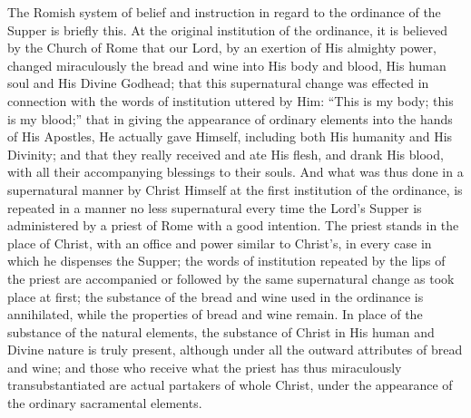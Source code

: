 \documentclass[]{book}
\begin{document}
The Romish system of belief and instruction in regard to the ordinance of the Supper is briefly this. At the original institution of the ordinance, it is believed by the Church of Rome that our Lord, by an exertion of His almighty power, changed miraculously the bread and wine into His body and blood, His human soul and His Divine Godhead; that this supernatural change was effected in connection with the words of institution uttered by Him: ``This is my body; this is my blood;'' that in giving the appearance of ordinary elements into the hands of His Apostles, He actually gave Himself, including both His humanity and His Divinity; and that they really received and ate His flesh, and drank His blood, with all their accompanying blessings to their souls. And what was thus done in a supernatural manner by Christ Himself at the first institution of the ordinance, is repeated in a manner no less supernatural every time the Lord's Supper is administered by a priest of Rome with a good intention. The priest stands in the place of Christ, with an office and power similar to Christ's, in every case in which he dispenses the Supper; the words of institution repeated by the lips of the priest are accompanied or followed by the same supernatural change as took place at first; the substance of the bread and wine used in the ordinance is annihilated, while the properties of bread and wine remain. In place of the substance of the natural elements, the substance of Christ in His human and Divine nature is truly present, although under all the outward attributes of bread and wine; and those who receive what the priest has thus miraculously transubstantiated are actual partakers of whole Christ, under the appearance of the ordinary sacramental elements.
\end{document}
